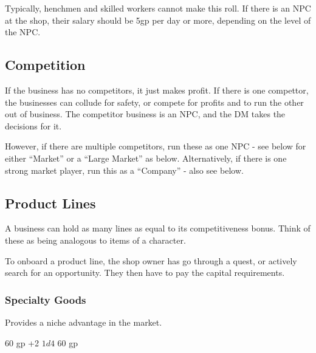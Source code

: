 \documentclass[twocolumn]{dndbook}
\begin{document}
Typically, henchmen and skilled workers cannot make this roll. If there is an NPC at the shop,
their salary should be 5gp per day or more, depending on the level of the NPC.

\subsection{Competition}
If the business has no competitors, it just makes profit.
If there is one compettor, the businesses can collude for safety, or compete for profits
and to run the other out of business. The competitor business is an NPC,
and the DM takes the decisions for it.\par

However, if there are multiple competitors, run these as one NPC - see below
for either ``Market'' or a ``Large Market'' as below.
Alternatively, if there is one strong
market player, run this as a ``Company'' - also see below.

\subsection{Product Lines}

A business can hold as many lines as equal to its competitiveness bonus.
Think of these as being analogous to items of a character.\par

To onboard a product line, the shop owner has go through a quest, or
actively search for an opportunity. They then have to pay the
capital requirements.\par


\subsubsection{Specialty Goods}

Provides a niche advantage in the market.\par

\begin{DndComment}[color=bgtan2018]{}
	\hfill 60 gp
	\hfill +2
	\hfill $1d4$
	\hfill 60 gp
\end{DndComment}
\end{document}
